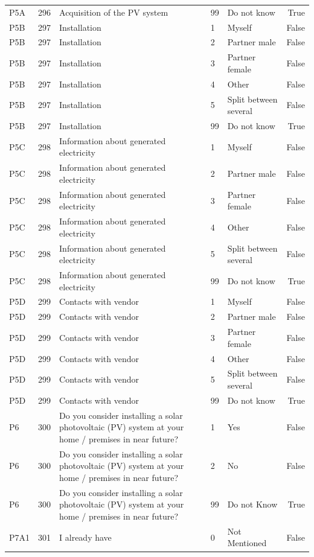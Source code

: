 \begin{tabular}{lrlllr}
P5A & 296 & Acquisition of the PV system & 99 & Do not know & True \\
P5B & 297 & Installation & 1 & Myself & False \\
P5B & 297 & Installation & 2 & Partner male & False \\
P5B & 297 & Installation & 3 & Partner female & False \\
P5B & 297 & Installation & 4 & Other & False \\
P5B & 297 & Installation & 5 & Split between several & False \\
P5B & 297 & Installation & 99 & Do not know & True \\
P5C & 298 & Information about generated electricity & 1 & Myself & False \\
P5C & 298 & Information about generated electricity & 2 & Partner male & False \\
P5C & 298 & Information about generated electricity & 3 & Partner female & False \\
P5C & 298 & Information about generated electricity & 4 & Other & False \\
P5C & 298 & Information about generated electricity & 5 & Split between several & False \\
P5C & 298 & Information about generated electricity & 99 & Do not know & True \\
P5D & 299 & Contacts with vendor & 1 & Myself & False \\
P5D & 299 & Contacts with vendor & 2 & Partner male & False \\
P5D & 299 & Contacts with vendor & 3 & Partner female & False \\
P5D & 299 & Contacts with vendor & 4 & Other & False \\
P5D & 299 & Contacts with vendor & 5 & Split between several & False \\
P5D & 299 & Contacts with vendor & 99 & Do not know & True \\
P6 & 300 & Do you consider installing a solar photovoltaic (PV) system at your home / premises in near future? & 1 & Yes & False \\
P6 & 300 & Do you consider installing a solar photovoltaic (PV) system at your home / premises in near future? & 2 & No & False \\
P6 & 300 & Do you consider installing a solar photovoltaic (PV) system at your home / premises in near future? & 99 & Do not Know & True \\
P7A1 & 301 & I already have & 0 & Not Mentioned & False \\

\end{tabular}
